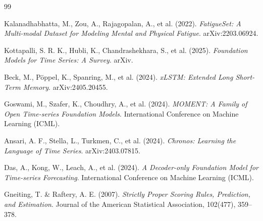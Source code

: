 \documentclass[12pt, a4paper]{article}
\begin{document}

\begin{thebibliography}{99}

Kalanadhabhatta, M., Zou, A., Rajagopalan, A., et al. (2022).
\textit{FatigueSet: A Multi-modal Dataset for Modeling Mental and Physical Fatigue}.
arXiv:2203.06924.

Kottapalli, S. R. K., Hubli, K., Chandrashekhara, S., et al. (2025).
\textit{Foundation Models for Time Series: A Survey}.
arXiv.

Beck, M., Pöppel, K., Spanring, M., et al. (2024).
\textit{xLSTM: Extended Long Short-Term Memory}.
arXiv:2405.20455.

Goswami, M., Szafer, K., Choudhry, A., et al. (2024).
\textit{MOMENT: A Family of Open Time-series Foundation Models}.
International Conference on Machine Learning (ICML).

Ansari, A. F., Stella, L., Turkmen, C., et al. (2024).
\textit{Chronos: Learning the Language of Time Series}.
arXiv:2403.07815.

Das, A., Kong, W., Leach, A., et al. (2024).
\textit{A Decoder-only Foundation Model for Time-series Forecasting}.
International Conference on Machine Learning (ICML).

Gneiting, T. \& Raftery, A. E. (2007).
\textit{Strictly Proper Scoring Rules, Prediction, and Estimation}.
Journal of the American Statistical Association, 102(477), 359--378.

\end{thebibliography}
\end{document}
